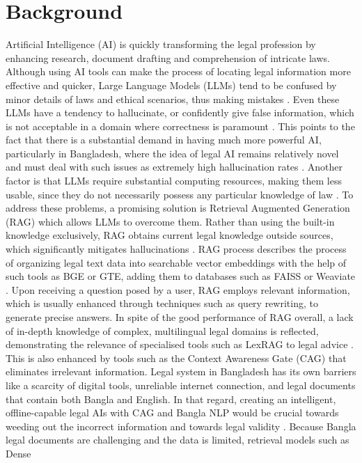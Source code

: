 

\section{Background} 
Artificial Intelligence (AI) is quickly transforming the legal profession by enhancing research, document drafting and comprehension of intricate laws. Although using AI tools can make the process of locating legal information more effective and quicker, Large Language Models (LLMs) tend to be confused by minor details of laws and ethical scenarios, thus making mistakes \cite{terzidou2025generative}. Even these LLMs have a tendency to hallucinate, or confidently give false information, which is not acceptable in a domain where correctness is paramount \cite{terzidou2025generative}\cite{Li2024}. This points to the fact that there is a substantial demand in having much more powerful AI, particularly in Bangladesh, where the idea of legal AI remains relatively novel and must deal with such issues as extremely high hallucination rates \cite{fan2024surveyragmeetingllms}\cite{Li2024}. Another factor is that LLMs require substantial computing resources, making them less usable, since they do not necessarily possess any particular knowledge of law \cite{fan2024surveyragmeetingllms}. To address these problems, a promising solution is Retrieval Augmented Generation (RAG) which allows LLMs to overcome them. Rather than using the built-in knowledge exclusively, RAG obtains current legal knowledge outside sources, which significantly mitigates hallucinations \cite{fan2024surveyragmeetingllms}\cite{lewis2021retrievalaugmentedgenerationknowledgeintensivenlp}. RAG process describes the process of organizing legal text data into searchable vector embeddings with the help of such tools as BGE or GTE, adding them to databases such as FAISS or Weaviate \cite{panchal2025lawpalretrievalaugmented}\cite{li2025lexragbenchmarkingretrievalaugmentedgeneration}\cite{khan2025efficienteducationalchatbotsbenchmarking}. Upon receiving a question posed by a user, RAG employs relevant information, which is usually enhanced through techniques such as query rewriting, to generate precise answers. In spite of the good performance of RAG overall, a lack of in-depth knowledge of complex, multilingual legal domains is reflected, demonstrating the relevance of specialised tools such as LexRAG to legal advice \cite{li2025lexragbenchmarkingretrievalaugmentedgeneration}. This is also enhanced by tools such as the Context Awareness Gate (CAG) that eliminates irrelevant information. Legal system in Bangladesh has its own barriers like a scarcity of digital tools, unreliable internet connection, and legal documents that contain both Bangla and English. In that regard, creating an intelligent, offline-capable legal AIs with CAG and Bangla NLP would be crucial towards weeding out the incorrect information and towards legal validity \cite{heydari2025contextawarenessgateretrieval}. Because Bangla legal documents are challenging and the data is limited, retrieval models such as Dense 